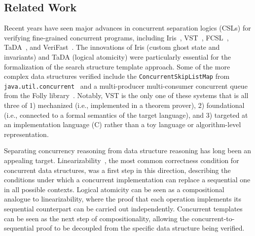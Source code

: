 \documentclass[a4paper,UKenglish,cleveref, autoref, thm-restate]{lipics-v2021}
\begin{document}
\subsection*{Related Work}
Recent years have seen major advances in concurrent separation logics (CSLs) for verifying fine-grained concurrent programs, including Iris~\cite{iris}, VST~\cite{plcc,iris-vst-arxiv}, FCSL~\cite{fcsl}, TaDA~\cite{tada}, and VeriFast~\cite{verifast-conc}. The innovations of Iris (custom ghost state and invariants) and TaDA (logical atomicity) were particularly essential for the formalization of the search structure template approach. Some of the more complex data structures verified include the \lstinline{ConcurrentSkipListMap} from \lstinline{java.util.concurrent}~\cite{Xiong2017Abstract} and a multi-producer multi-consumer concurrent queue from the Folly library~\cite{iris-folly}. Notably, VST is the only one of these systems that is all three of 1) mechanized (i.e., implemented in a theorem prover), 2) foundational (i.e., connected to a formal semantics of the target language), and 3) targeted at an implementation language (C) rather than a toy language or algorithm-level representation. %


Separating concurrency reasoning from data structure reasoning has long been an appealing target. Linearizability~\cite{linearizability}, the most common correctness condition for concurrent data structures, was a first step in this direction, describing the conditions under which a concurrent implementation can replace a sequential one in all possible contexts. Logical atomicity can be seen as a compositional analogue to linearizability, where the proof that each operation implements its sequential counterpart can be carried out independently. Concurrent templates can be seen as the next step of compositionality, allowing the concurrent-to-sequential proof to be decoupled from the specific data structure being verified.
\end{document}
